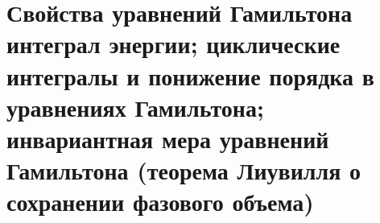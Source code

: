 \section{Свойства уравнений Гамильтона интеграл энергии; циклические интегралы и понижение порядка в уравнениях Гамильтона; инвариантная мера уравнений Гамильтона (теорема Лиувилля о сохранении фазового объема)}\label{chasec18}



\newpage